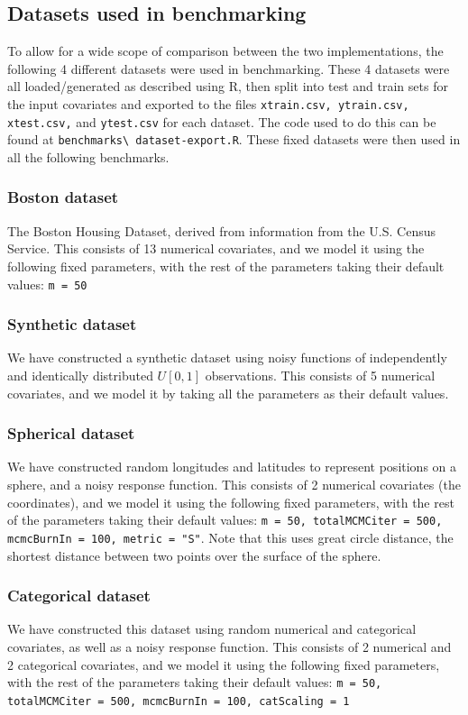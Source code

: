 \documentclass[10pt]{article}
\begin{document}
\subsection{Datasets used in benchmarking}
To allow for a wide scope of comparison between the two implementations, the following 4 different datasets were used in benchmarking. These 4 datasets were all loaded/generated as described using R, then split into test and train sets for the input covariates and exported to the files \texttt{xtrain.csv, ytrain.csv, xtest.csv,} and \texttt{ytest.csv} for each dataset. The code used to do this can be found at \nolinkurl{benchmarks\ dataset-export.R}\cite{repo}. These fixed datasets were then used in all the following benchmarks.
\subsubsection{Boston dataset}
The Boston Housing Dataset, derived from information from the U.S. Census Service. This consists of 13 numerical covariates, and we model it using the following fixed parameters, with the rest of the parameters taking their default values: \texttt{m = 50}
\subsubsection{Synthetic dataset}
We have constructed a synthetic dataset using noisy functions of independently and identically distributed $U[0,1]$ observations. This consists of 5 numerical covariates, and we model it by taking all the parameters as their default values.
\subsubsection{Spherical dataset}
We have constructed random longitudes and latitudes to represent positions on a sphere, and a noisy response function. This consists of 2 numerical covariates (the coordinates), and we model it using the following fixed parameters, with the rest of the parameters taking their default values: \texttt{m = 50, totalMCMCiter = 500, mcmcBurnIn = 100, metric = "S"}. Note that this uses great circle distance, the shortest distance between two points over the surface of the sphere.
\subsubsection{Categorical dataset}
We have constructed this dataset using random numerical and categorical covariates, as well as a noisy response function. This consists of 2 numerical and 2 categorical covariates, and we model it using the following fixed parameters, with the rest of the parameters taking their default values: \texttt{m = 50, totalMCMCiter = 500, mcmcBurnIn = 100, catScaling = 1}
\end{document}
